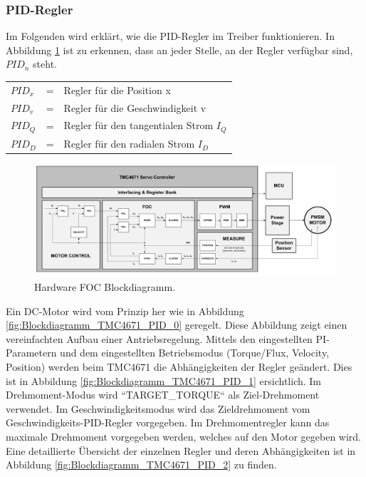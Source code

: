 \newpage

\subsubsection{PID-Regler}

Im Folgenden wird erklärt, wie die PID-Regler im Treiber funktionieren.
In Abbildung \ref{fig:Blockdiagramm_TMC4671_PID} ist zu erkennen, dass an jeder Stelle, an der Regler verfügbar sind, $PID_n$ steht.

\begin{tabular}{lll}
$PID_x$ & = & Regler für die Position x\\
$PID_v$ & = & Regler für die Geschwindigkeit v \\
$PID_Q$ & = & Regler für den tangentialen Strom $I_Q$ \\
$PID_D$ & = & Regler für den radialen Strom $I_D$ \\
\end{tabular}

\begin{figure}[h!]
	\centering
	\includegraphics[width=\textwidth]{graphics/Blockdiagramm_TMC4671_FOC.png}
	\caption{Hardware FOC Blockdiagramm.\cite{trinamic_datasheet_2018}}
	\label{fig:Blockdiagramm_TMC4671_PID}
\end{figure}

 Ein DC-Motor wird vom Prinzip her wie in Abbildung \ref{fig:Blockdiagramm_TMC4671_PID_0} geregelt. Diese Abbildung zeigt einen vereinfachten Aufbau einer Antriebsregelung. Mittels den eingestellten PI-Parametern und dem eingestellten Betriebsmodus (Torque/Flux, Velocity, Position) werden beim TMC4671 die Abhängigkeiten der Regler geändert. Dies ist in Abbildung \ref{fig:Blockdiagramm_TMC4671_PID_1} ersichtlich. Im Drehmoment-Modus wird ``TARGET\_TORQUE`` als Ziel-Drehmoment verwendet. Im Geschwindigkeitsmodus wird das Zieldrehmoment vom Geschwindigkeits-PID-Regler vorgegeben. Im Drehmomentregler kann das maximale Drehmoment vorgegeben werden, welches auf den Motor gegeben wird. Eine detaillierte Übersicht der einzelnen Regler und deren Abhängigkeiten ist in Abbildung \ref{fig:Blockdiagramm_TMC4671_PID_2} zu finden.
\\


